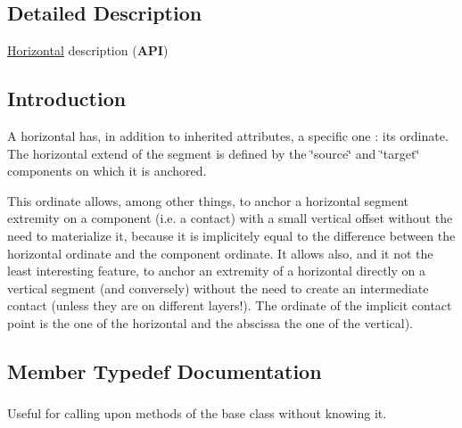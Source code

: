 \subsection{Detailed Description}
\hyperlink{classHurricane_1_1Horizontal}{Horizontal} description ({\bfseries A\-P\-I}) 

\hypertarget{classHurricane_1_1Horizontal_secHorizontalIntro}{}\subsection{Introduction}\label{classHurricane_1_1Horizontal_secHorizontalIntro}
A horizontal has, in addition to inherited attributes, a specific one \-: its ordinate. The horizontal extend of the segment is defined by the \char`\"{}source\char`\"{} and \char`\"{}target\char`\"{} components on which it is anchored.

This ordinate allows, among other things, to anchor a horizontal segment extremity on a component (i.\-e. a contact) with a small vertical offset without the need to materialize it, because it is implicitely equal to the difference between the horizontal ordinate and the component ordinate. It allows also, and it not the least interesting feature, to anchor an extremity of a horizontal directly on a vertical segment (and conversely) without the need to create an intermediate contact (unless they are on different layers!). The ordinate of the implicit contact point is the one of the horizontal and the abscissa the one of the vertical). 

\subsection{Member Typedef Documentation}
\hypertarget{classHurricane_1_1Horizontal_a43266e3530dc5872f4eabf16eba86bdb}{
\subsubsection[{Inherit}]{}}\label{classHurricane_1_1Horizontal_a43266e3530dc5872f4eabf16eba86bdb}
Useful for calling upon methods of the base class without knowing it. 

